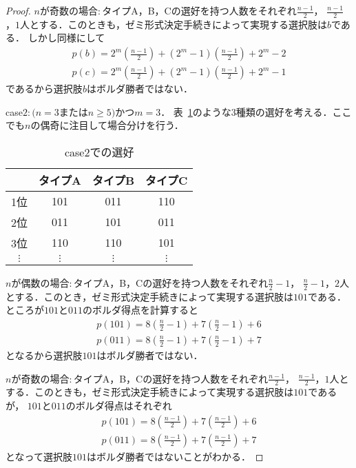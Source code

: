 \documentclass[dvipdfmx]{jsarticle}
\begin{document}
\begin{proof}
  \noindent{}$n$が奇数の場合$\colon$タイプA，B，Cの選好を持つ人数をそれぞれ$\frac{n-1}{2}$，
  $\frac{n-1}{2}$，$1$人とする．このときも，ゼミ形式決定手続きによって実現する選択肢は$b$である．
  しかし同様にして
  \begin{gather*}
    p(b) = 2^m(\frac{n-1}{2}) + (2^m-1)(\frac{n-1}{2}) + 2^m - 2 \\
    p(c) = 2^m(\frac{n-1}{2}) + (2^m-1)(\frac{n-1}{2}) + 2^m - 1
  \end{gather*}
  であるから選択肢$b$はボルダ勝者ではない．

  \noindent{}case$2\colon$$(n = 3$または$n \geq 5)$かつ$m = 3$．
  表~\ref{tab:case2}のような$3$種類の選好を考える．ここでも$n$の偶奇に注目して場合分けを行う．
  \begin{table}[h]
    \caption{case2での選好}\label{tab:case2}
    \begin{center}
      \begin{tabular}{c|c|c|c}\hline
            & タイプA & タイプB & タイプC \\ \hline
        1位 & 101 & 011 & 110 \\ 
        2位 & 011 & 101 & 011 \\ 
        3位 & 110 & 110 & 101 \\ 
        $\vdots$ & $\vdots$ & $\vdots$ & $\vdots$ \\ \hline
      \end{tabular}
    \end{center}
  \end{table}

  \noindent{}$n$が偶数の場合$\colon$タイプA，B，Cの選好を持つ人数をそれぞれ$\frac{n}{2}-1$，
  $\frac{n}{2}-1$，$2$人とする．このとき，ゼミ形式決定手続きによって実現する選択肢は$101$である．
  ところが$101$と$011$のボルダ得点を計算すると
  \begin{gather*}
    p(101) = 8(\frac{n}{2}-1) + 7(\frac{n}{2}-1) + 6 \\
    p(011) = 8(\frac{n}{2}-1) + 7(\frac{n}{2}-1) + 7
  \end{gather*}
  となるから選択肢$101$はボルダ勝者ではない．

  \noindent{}$n$が奇数の場合$\colon$タイプA，B，Cの選好を持つ人数をそれぞれ$\frac{n-1}{2}$，
  $\frac{n-1}{2}$，$1$人とする．このときも，ゼミ形式決定手続きによって実現する選択肢は$101$であるが，
  $101$と$011$のボルダ得点はそれぞれ
  \begin{gather*}
    p(101) = 8(\frac{n-1}{2}) + 7(\frac{n-1}{2}) + 6 \\
    p(011) = 8(\frac{n-1}{2}) + 7(\frac{n-1}{2}) + 7
  \end{gather*}
  となって選択肢$101$はボルダ勝者ではないことがわかる．


\end{proof}
\end{document}
